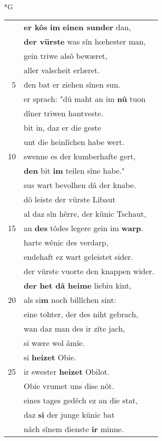 \documentclass[8pt,a4paper,notitlepage]{article}
\begin{document}
\begin{table}[ht]
\begin{minipage}[t]{0.5\linewidth}
\small
\begin{center}*G
\end{center}
\begin{tabular}{rl}
 & \textbf{er kôs} \textbf{im} \textbf{einen sunder} dan,\\ 
 & \textbf{der vürste} was sîn hœhester man,\\ 
 & gein triwe alsô bewæret,\\ 
 & aller valscheit erlæret.\\ 
5 & den bat er ziehen sînen sun.\\ 
 & er sprach: "dû maht an im \textbf{nû} tuon\\ 
 & dîner triwen hantveste.\\ 
 & bit in, daz er die geste\\ 
 & unt die heinlîchen habe wert.\\ 
10 & swenne es der kumberhafte gert,\\ 
 & \textbf{den} bit \textbf{im} teilen sîne habe."\\ 
 & sus wart bevolhen dâ der knabe.\\ 
 & dô leiste der vürste Libaut\\ 
 & al daz sîn hêrre, der künic Tschaut,\\ 
15 & an \textbf{des} tôdes legere gein im \textbf{warp}.\\ 
 & harte wênic des verdarp,\\ 
 & endehaft ez wart geleistet sider.\\ 
 & der vürste vuorte den knappen wider.\\ 
 & \textbf{der het dâ heime} liebiu kint,\\ 
20 & als si\textbf{m} noch billîchen sint:\\ 
 & eine tohter, der des niht gebrach,\\ 
 & wan daz man des ir zîte jach,\\ 
 & si wære wol âmîe.\\ 
 & si \textbf{heizet} Obie.\\ 
25 & ir swester \textbf{heizet} Obilot.\\ 
 & Obie vrumet uns dise nôt.\\ 
 & eines tages gedêch ez an die stat,\\ 
 & daz \textbf{si} der junge künic bat\\ 
 & nâch sînem dienste \textbf{ir} minne.\\ 

\end{tabular}
\end{minipage}
\end{table}
\end{document}
